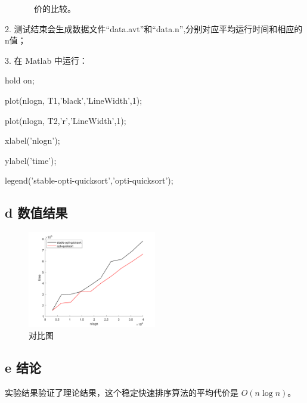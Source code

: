 \documentclass[twoside,a4paper]{article}
\begin{document}
\begin{CJK*}{UTF8}{gkai}
  \ \ \ \ \ \ \ 价的比较。
  
  2. 测试结束会生成数据文件“data.avt”和“data.n”,分别对应平均运行时间和相应的n值；
  
  3. 在 Matlab 中运行：
  
   hold on;
  
  plot(nlogn, T1,'black','LineWidth',1);
  
  plot(nlogn, T2,'r','LineWidth',1);
  
  xlabel('nlogn');
  
  ylabel('time');
  
  legend('stable-opti-quicksort','opti-quicksort');
  
  
\subsection*{d 数值结果}

\begin{figure}[htbp]
  \centering
  \includegraphics[width=0.5\textwidth]{plot.png}
  \caption{对比图}
  \label{fig:}
\end{figure}
\subsection*{e 结论}

实验结果验证了理论结果，这个稳定快速排序算法的平均代价是 $O(n \log n)$。



\end{CJK*}
\end{document}
